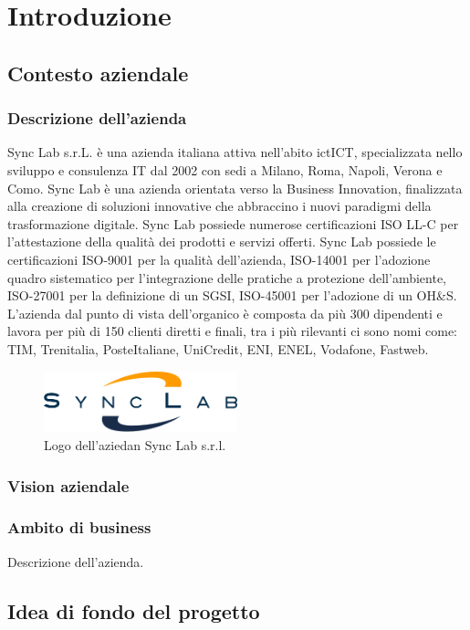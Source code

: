 \chapter{Introduzione}
\label{cap:introduzione}
\section{Contesto aziendale}
\subsection{Descrizione dell'azienda}
Sync Lab s.r.L. è una azienda italiana attiva nell'abito \gls{ict}{ICT}, specializzata nello sviluppo e consulenza IT dal 2002 con sedi a 
Milano, Roma, Napoli, Verona e Como.  Sync Lab è una azienda orientata verso la Business Innovation, finalizzata alla 
creazione di soluzioni innovative che abbraccino i nuovi paradigmi della trasformazione digitale.
Sync Lab possiede numerose certificazioni ISO LL-C per l'attestazione della 
qualità dei prodotti e servizi offerti. Sync Lab possiede le certificazioni 
ISO-9001 per la qualità dell'azienda, ISO-14001 per l'adozione quadro sistematico per l'integrazione delle pratiche a protezione dell'ambiente, ISO-27001 per la definizione di un SGSI, ISO-45001 per l'adozione di un OH\&S.
\\
L'azienda dal punto di vista dell'organico è composta da più 300 dipendenti e lavora per più di 150 clienti diretti e finali, tra i più rilevanti ci sono nomi come: TIM, Trenitalia, PosteItaliane, UniCredit, ENI, ENEL, Vodafone, Fastweb.
\begin{figure}[htbp]
    \centering
    \includegraphics[width=0.5\textwidth]{images/introduzione/logo_azienda.png}
    \caption{Logo dell'aziedan Sync Lab s.r.l.}
\end{figure}
\subsection{Vision aziendale}
\subsection{Ambito di business}
Descrizione dell'azienda.

\section{Idea di fondo del progetto}

